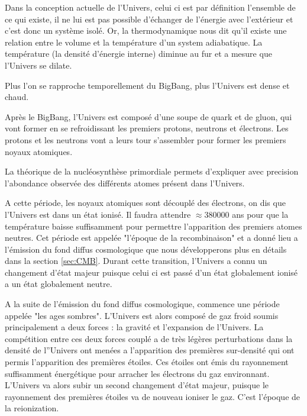 
Dans la conception actuelle de l'Univers, celui ci est par définition l'ensemble de ce qui existe, il ne lui est pas possible d'échanger de l’énergie avec l’extérieur et c'est donc un système isolé.
Or, la thermodynamique nous dit qu'il existe une relation entre le volume et la température d'un system adiabatique.
La température (la densité d'énergie interne) diminue au fur et a mesure que l'Univers se dilate.

Plus l'on se rapproche temporellement du BigBang, plus l'Univers est dense et chaud.

Après le BigBang, l'Univers est composé d'une soupe de quark et de gluon, qui vont former en se refroidissant les premiers protons, neutrons et électrons.
Les protons et les neutrons vont a leurs tour s'assembler pour former les premiers noyaux atomiques.

La théorique de la nucléosynthèse primordiale permets d'expliquer avec precision l'abondance observée des différents atomes présent dans l'Univers.

A cette période, les noyaux atomiques sont découplé des électrons, on dis que l'Univers est dans un état ionisé.
Il faudra attendre $\approx 380 000$  ans pour que la température baisse suffisamment pour permettre l'apparition des premiers atomes neutres.
Cet période est appelée "l'époque de la recombinaison" et a donné lieu a l'émission du fond diffus cosmologique que nous développerons plus en détails dans la section \ref{sec:CMB}.
Durant cette transition, l'Univers a connu un changement d'état majeur puisque celui ci est passé d'un état globalement ionisé a un état globalement neutre.

A la suite de l'émission du fond diffus cosmologique, commence une période appelée "les ages sombres".
L'Univers est alors composé de gaz froid soumis principalement a deux forces : la gravité et l'expansion de l'Univers.
La compétition entre ces deux forces couplé a de très légères perturbations dans la densité de l''Univers ont menées a l'apparition des premières sur-densité qui ont permis l'apparition des premières étoiles.
Ces étoiles ont émis du rayonnement suffisamment énergétique pour arracher les électrons du gaz environnant.
L'Univers va alors subir un second changement d'état majeur, puisque le rayonnement des premières étoiles va de nouveau ioniser le gaz.
C'est l'époque de la reionization.









